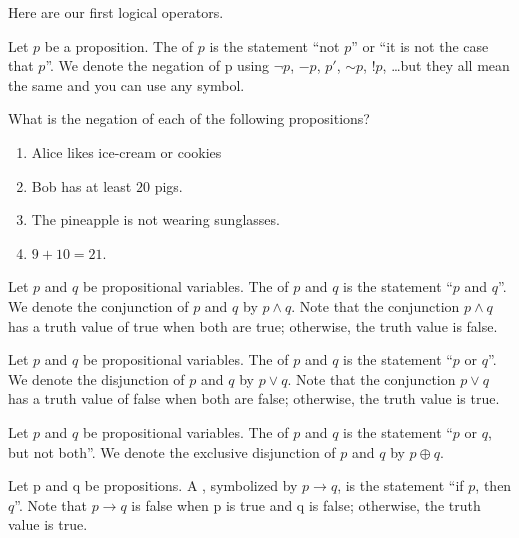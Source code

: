\documentclass[../main.tex]{subfiles}
\begin{document}
Here are our first logical operators.
\begin{definition}[negation]
    Let $p$ be a proposition. The  of $p$ is the statement ``not $p$'' or ``it is not the case that $p$''. We denote the negation of p using $\neg p$, $ -p$, $p'$, ${\sim}p$, $!p$, \ldots but they all mean the same and you can use any symbol. 
\end{definition}
\begin{exercise}
    What is the negation of each of the following propositions?
    \begin{enumerate}[label=(\alph*)]
        \item Alice likes ice-cream or cookies
        \item Bob has at least $20$ pigs.
        \item The pineapple is not wearing sunglasses.
        \item $9 + 10 = 21$.
    \end{enumerate}
\end{exercise}
\begin{definition}
    Let $p$ and $q$ be propositional variables. The  of $p$ and $q$ is the statement ``$p$ and $q$''. We denote the conjunction of $p$ and $q$ by $p \land q$. Note that the conjunction $ p \land q$ has a truth value of true when both are true; otherwise, the truth value is false. 
\end{definition} 
\begin{definition}
    Let $p$ and $q$ be propositional variables. The  of $p$ and $q$ is the statement ``$p$ or $q$''. We denote the disjunction of $p$ and $q$ by $p \lor q$. Note that the conjunction $ p \lor q$ has a truth value of false when both are false; otherwise, the truth value is true. 
\end{definition}
\begin{definition}
    Let $p$ and $q$ be propositional variables. The  of $p$ and $q$ is the statement ``$p$ or $q$, but not both''. We denote the exclusive disjunction of $p$ and $q$ by $p \oplus q$. 
\end{definition}
\begin{definition}
    Let p and q be propositions. A , symbolized by $p \rightarrow q$, is the statement ``if $p$, then $q$''. Note that $ p \rightarrow q$ is false when p is true and q is false; otherwise, the truth value is true. 
\end{definition}
\end{document}
